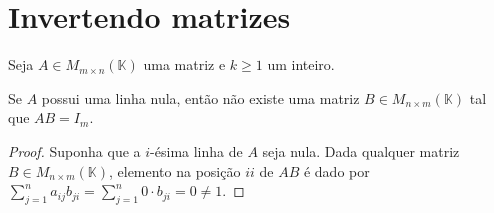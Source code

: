 \section{Invertendo matrizes}
\begin{lemma}
    Seja $A\in M_{m\times n}(\mathbb K)$ uma matriz e $k\geq 1$ um inteiro.

    Se $A$  possui uma linha nula, então não existe uma matriz $B\in M_{n\times m}(\mathbb K)$ tal que $AB=I_m$.
\end{lemma}

\begin{proof}
    Suponha que a $i$-ésima linha de $A$ seja nula.
    Dada qualquer matriz $B\in M_{n\times m}(\mathbb K)$, elemento na posição $ii$ de $AB$ é dado por $\sum_{j=1}^n a_{ij}b_{ji}=\sum_{j=1}^n 0\cdot b_{ji}=0\neq 1$.
\end{proof}
